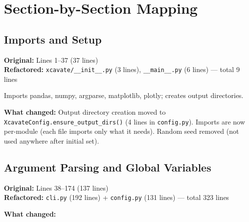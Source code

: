 \documentclass[11pt,letterpaper]{article}
\newcommand{\code}[1]{\texttt{#1}}
\begin{document}
\section{Section-by-Section Mapping}

\subsection{Imports and Setup}

\textbf{Original:} Lines 1--37 (37 lines)\\
\textbf{Refactored:} \code{xcavate/\_\_init\_\_.py} (3 lines), \code{\_\_main\_\_.py} (6 lines) --- total 9 lines

Imports pandas, numpy, argparse, matplotlib, plotly; creates output directories.

\textbf{What changed:} Output directory creation moved to \code{XcavateConfig.ensure\_output\_dirs()} (4 lines in \code{config.py}). Imports are now per-module (each file imports only what it needs). Random seed removed (not used anywhere after initial set).

\subsection{Argument Parsing and Global Variables}

\textbf{Original:} Lines 38--174 (137 lines)\\
\textbf{Refactored:} \code{cli.py} (192 lines) + \code{config.py} (131 lines) --- total 323 lines

\textbf{What changed:}
\end{document}
